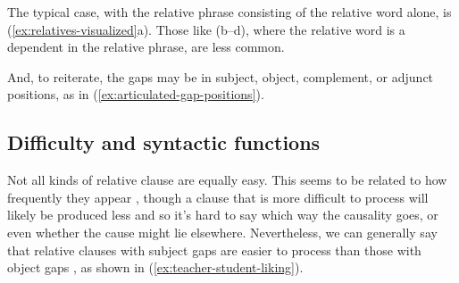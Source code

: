 The typical case, with the relative phrase consisting of the relative word alone, is (\ref{ex:relatives-visualized}a). Those like (b--d), where the relative word is a dependent in the relative phrase, are less common.

And, to reiterate, the gaps may be in subject, object, complement, or adjunct positions, as in (\ref{ex:articulated-gap-positions}).

\subsection{Difficulty and syntactic functions} \label{sec:difficulty-relatives}

Not all kinds of relative clause are equally easy. This seems to be related to how frequently they appear \citep{Reali2007}, though a clause that is more difficult to process will likely be produced less and so it's hard to say which way the causality goes, or even whether the cause might lie elsewhere. Nevertheless, we can generally say that relative clauses with subject gaps are easier to process than those with object gaps \citep{Lau2021}, as shown in (\ref{ex:teacher-student-liking}).

\ea \label{ex:relatives-visualized}
    \z
\z






